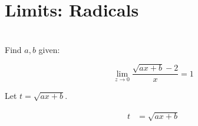 \documentclass[20150903-160354-rs2.2-MarksMathNotebook.tex]{subfiles}
\begin{document}
%
%

\chapter{Limits: Radicals}

\begin{example}[id:20151014-172413] \label{20151014-172413} \hfill \\
Find $a, b$ given:

\[
\displaystyle \lim_{z \to 0} \dfrac{\sqrt{ax+b}-2}{x}=1
\]

\soln

\solnsteps

Let $t=\sqrt{ax+b}$.

\begin{align*}
t &= \sqrt{ax+b}\\
\
\end{align*}
\end{example}
\end{document}
